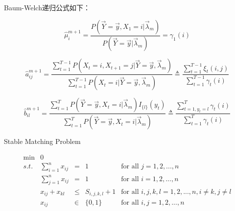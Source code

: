 \documentclass[a4paper,12pt]{article}
\begin{document}
Baum-Welch递归公式如下：

\begin{equation} 
\hat\mu_i^{m+1}=\frac{P(\vec Y=\vec y,X_1=i|\vec\lambda_m)}{P(\vec Y=\vec y|\vec\lambda_m)}=\gamma_1(i)
\end{equation}

\begin{equation} 
\hat a_{ij}^{m+1}=\frac{\sum\limits_{t=1}^{T-1}P(X_t=i,X_{t+1}=j|\vec Y=\vec y,\vec\lambda_m)}{\sum\limits_{t=1}^{T-1}P(X_t=i|\vec Y=\vec y,\vec\lambda_m)}\triangleq\frac{\sum\limits_{t=1}^{T-1}\xi_t(i,j)}{\sum\limits_{t=1}^{T-1}\gamma_t(i)}
\end{equation}

\begin{equation} 
\hat b_{il}^{m+1}=\frac{\sum\limits_{t=1}^TP(\vec Y=\vec y,X_t=i|\vec\lambda_m)I_{\{l\}}(y_t)}{\sum\limits_{t=1}^TP(\vec Y=\vec y,X_t=i|\vec\lambda_m)}\triangleq\frac{\sum\limits_{t=1,y_t=l}^T\gamma_t(i)}{\sum\limits_{t=1}^T\gamma_t(i)}
\end{equation}

Stable Matching Problem

\begin{equation}
\begin{array}{rrcll}
 \min & 0 &   \\
 s.t. & \sum_{i=1}^nx_{ij} & = & 1 & \text{for all $j=1,2,...,n$}  \\
      & \sum_{j=1}^nx_{ij} & = & 1 & \text{for all $i=1,2,...,n$}  \\
      & x_{ij}+x_{kl} & \leq & S_{i,j,k,l}+1 & \text{for all $i,j,k,l=1,2,...,n, i\neq k,j\neq l$}\\
      & x_{ij} & \in & \{0,1\} & \text{for all $i,j=1,2,...,n$}
\end{array}
\end{equation}

\end{document}
